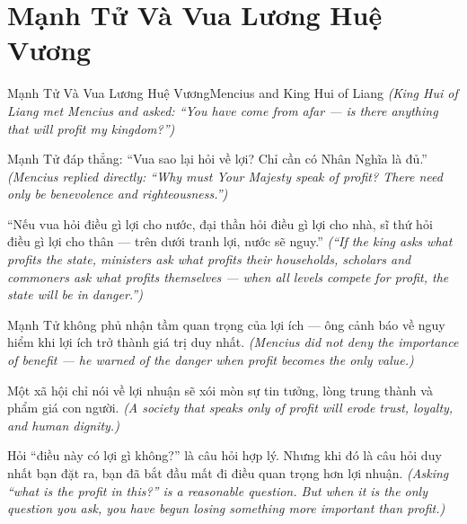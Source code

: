\section{Mạnh Tử Và Vua Lương Huệ Vương}
\begin{truyen}{Mạnh Tử Và Vua Lương Huệ Vương}{Mencius and King Hui of Liang}
\textit{(King Hui of Liang met Mencius and asked: ``You have come from afar — is there anything that will profit my kingdom?'')}

Mạnh Tử đáp thẳng: ``Vua sao lại hỏi về lợi? Chỉ cần có Nhân Nghĩa là đủ.''
\textit{(Mencius replied directly: ``Why must Your Majesty speak of profit? There need only be benevolence and righteousness.'')}

``Nếu vua hỏi điều gì lợi cho nước, đại thần hỏi điều gì lợi cho nhà, sĩ thứ hỏi điều gì lợi cho thân — trên dưới tranh lợi, nước sẽ nguy.''
\textit{(``If the king asks what profits the state, ministers ask what profits their households, scholars and commoners ask what profits themselves — when all levels compete for profit, the state will be in danger.'')}

Mạnh Tử không phủ nhận tầm quan trọng của lợi ích — ông cảnh báo về nguy hiểm khi lợi ích trở thành giá trị duy nhất.
\textit{(Mencius did not deny the importance of benefit — he warned of the danger when profit becomes the only value.)}

Một xã hội chỉ nói về lợi nhuận sẽ xói mòn sự tin tưởng, lòng trung thành và phẩm giá con người.
\textit{(A society that speaks only of profit will erode trust, loyalty, and human dignity.)}

\end{truyen}

\begin{baihoc}
Hỏi ``điều này có lợi gì không?'' là câu hỏi hợp lý. Nhưng khi đó là câu hỏi duy nhất bạn đặt ra, bạn đã bắt đầu mất đi điều quan trọng hơn lợi nhuận.
\textit{(Asking ``what is the profit in this?'' is a reasonable question. But when it is the only question you ask, you have begun losing something more important than profit.)}
\end{baihoc}
\ngancach

